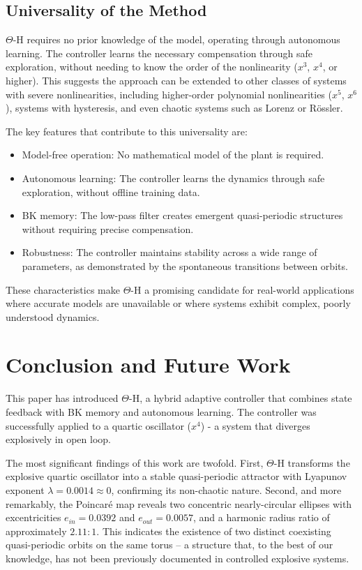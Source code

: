 \documentclass[twocolumn]{article}
\begin{document}
\subsection{Universality of the Method}

$\Theta$-H requires no prior knowledge of the model, operating through 
autonomous learning. The controller learns the necessary compensation 
through safe exploration, without needing to know the order of the 
nonlinearity ($x^3$, $x^4$, or higher). This suggests the approach 
can be extended to other classes of systems with severe nonlinearities, 
including higher-order polynomial nonlinearities ($x^5$, $x^6$), 
systems with hysteresis, and even chaotic systems such as Lorenz 
or R\"ossler.

The key features that contribute to this universality are:

\begin{itemize}
    \item Model-free operation: No mathematical model of 
    the plant is required.
    
    \item Autonomous learning: The controller learns the 
    dynamics through safe exploration, without offline training data.
    
    \item BK memory: The low-pass filter creates emergent 
    quasi-periodic structures without requiring precise compensation.
    
    \item Robustness: The controller maintains stability 
    across a wide range of parameters, as demonstrated by the 
    spontaneous transitions between orbits.
\end{itemize}

These characteristics make $\Theta$-H a promising candidate for 
real-world applications where accurate models are unavailable 
or where systems exhibit complex, poorly understood dynamics.

\section{Conclusion and Future Work}
\label{sec:conclusion}
This paper has introduced $\Theta$-H, a hybrid adaptive controller that 
combines state feedback with BK memory and autonomous learning. The 
controller was successfully applied to a quartic oscillator ($x^4$) - 
a system that diverges explosively in open loop.

The most significant findings of this work are twofold. First, $\Theta$-H 
transforms the explosive quartic oscillator into a stable quasi-periodic 
attractor with Lyapunov exponent $\lambda = 0.0014 \approx 0$, confirming 
its non-chaotic nature. Second, and more remarkably, the Poincar\'e map 
reveals two concentric nearly-circular ellipses with excentricities 
$e_{in} = 0.0392$ and $e_{out} = 0.0057$, and a harmonic radius ratio 
of approximately $2.11:1$. This indicates the existence of two distinct 
coexisting quasi-periodic orbits on the same torus -- a structure that, 
to the best of our knowledge, has not been previously documented in 
controlled explosive systems.
\end{document}
